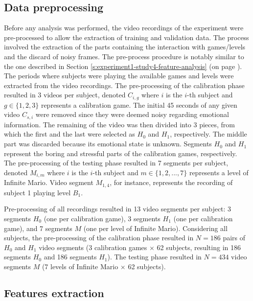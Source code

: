 \subsection{Data preprocessing}

Before any analysis was performed, the video recordings of the experiment were pre-processed to allow the extraction of training and validation data. The process involved the extraction of the parts containing the interaction with games/levels and the discard of noisy frames. The pre-process procedure is notably similar to the one described in Section \ref{s:experiment1-study4-feature-analysis} (on page \pageref{s:experiment1-study4-feature-analysis}). The periods where subjects were playing the available games and levels were extracted from the video recordings. The pre-processing of the calibration phase resulted in 3 videos per subject, denoted $C_{i,g}$ where $i$ is the $i$-th subject and $g \in \{1, 2, 3\}$ represents a calibration game. The initial 45 seconds of any given video $C_{s,i}$ were removed since they were deemed noisy regarding emotional information. The remaining of the video was then divided into 3 pieces, from which the first and the last were selected as $H_0$ and $H_1$, respectively. The middle part was discarded because its emotional state is unknown. Segments $H_0$ and $H_1$ represent the boring and stressful parts of the calibration games, respectively. The pre-processing of the testing phase resulted in 7 segments per subject, denoted $M_{i,m}$ where $i$ is the $i$-th subject and $m \in \{1, 2, ..., 7\}$ represents a level of Infinite Mario. Video segment $M_{1,4}$, for instance, represents the recording of subject 1 playing level $B_1$.

Pre-processing of all recordings resulted in 13 video segments per subject: 3 segments $H_0$ (one per calibration game), 3 segments $H_1$ (one per calibration game), and 7 segments $M$ (one per level of Infinite Mario). Considering all subjects, the pre-processing of the calibration phase resulted in $N=186$ pairs of $H_0$ and $H_1$ video segments (3 calibration games $\times$ 62 subjects, resulting in 186 segments $H_0$ and 186 segments $H_1$). The testing phase resulted in $N=434$ video segments $M$ (7 levels of Infinite Mario $\times$ 62 subjects).

\subsection{Features extraction}


